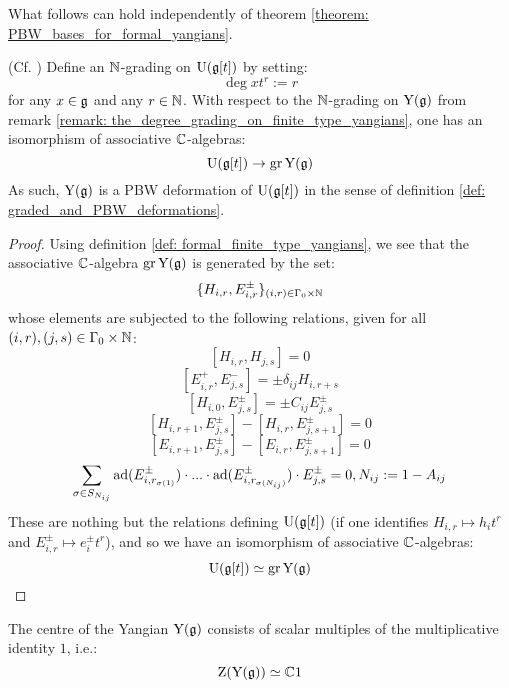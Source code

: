             What follows can hold independently of theorem \ref{theorem: PBW_bases_for_formal_yangians}. 
            \begin{lemma} \label{lemma: finite_type_yangians_as_PBW_deformations}
                (Cf. \cite[Proposition 12.1.6]{chari_pressley_quantum_groups}) Define an $\mathbb{N}$-grading on $\mathrm{U}(\mathfrak{g}[t])$ by setting:
                    $$\deg x t^r := r$$
                for any $x \in \mathfrak{g}$ and any $r \in \mathbb{N}$. With respect to the $\mathbb{N}$-grading on $\mathrm{Y}(\mathfrak{g})$ from remark \ref{remark: the_degree_grading_on_finite_type_yangians}, one has an isomorphism of associative $\mathbb{C}$-algebras:
                    $$\mathrm{U}( \mathfrak{g}[t] ) \to \operatorname{gr} \mathrm{Y}(\mathfrak{g})$$
                As such, $\mathrm{Y}(\mathfrak{g})$ is a PBW deformation of $\mathrm{U}(\mathfrak{g}[t])$ in the sense of definition \ref{def: graded_and_PBW_deformations}.
            \end{lemma}
                \begin{proof}
                    Using definition \ref{def: formal_finite_type_yangians}, we see that the associative $\mathbb{C}$-algebra $\operatorname{gr} \mathrm{Y}(\mathfrak{g})$ is generated by the set:
                        $$\{ H_{i, r}, E_{i, r}^{\pm} \}_{(i ,r) \in \Gamma_0 \x \N}$$
                    whose elements are subjected to the following relations, given for all $(i, r), (j, s) \in \Gamma_0 \x \N$:
                        $$[ H_{i, r}, H_{j, s} ] = 0$$
                        $$[ E_{i, r}^+, E_{j, s}^- ] = \pm \delta_{ij} H_{i, r + s}$$
                        $$[ H_{i, 0}, E_{j, s}^{\pm} ] = \pm C_{ij} E_{j, s}^{\pm}$$
                        $$[ H_{i, r + 1}, E_{j, s}^{\pm} ] - [ H_{i, r}, E_{j, s + 1}^{\pm} ] = 0$$
                        $$[ E_{i, r + 1}, E_{j, s}^{\pm} ] - [ E_{i, r}, E_{j, s + 1}^{\pm} ] = 0$$
                        $$\sum_{\sigma \in S_{N_{ij}}} \mathrm{ad}(E_{i, r_{\sigma(1)}}^{\pm}) \cdot ... \cdot \mathrm{ad}(E_{i, r_{\sigma(N_{ij})}}^{\pm}) \cdot E_{j, s}^{\pm} = 0, N_{ij} := 1 - A_{ij}$$
                    These are nothing but the relations defining $\mathrm{U}( \mathfrak{g}[t] )$ (if one identifies $H_{i, r} \mapsto h_i t^r$ and $E_{i, r}^{\pm} \mapsto e_i^{\pm} t^r$), and so we have an isomorphism of associative $\mathbb{C}$-algebras:
                        $$\mathrm{U}( \mathfrak{g}[t] ) \simeq \operatorname{gr} \mathrm{Y}(\mathfrak{g})$$ 
                \end{proof}
            \begin{corollary} \label{coro: centres_of_finite_type_yangians}
                The centre of the Yangian $\mathrm{Y}(\mathfrak{g})$ consists of scalar multiples of the multiplicative identity $1$, i.e.:
                    $$\mathrm{Z}( \mathrm{Y}(\mathfrak{g}) ) \simeq \mathbb{C} 1$$
            \end{corollary}
